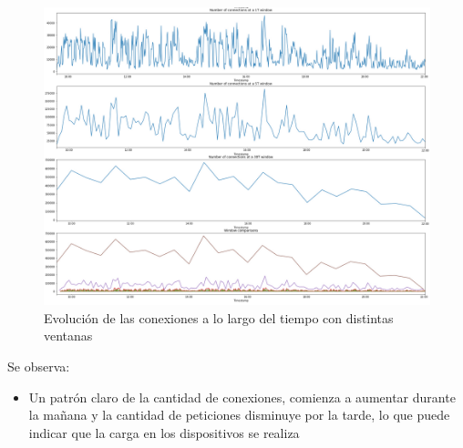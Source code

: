 \begin{figure}[H]
    \centering
    \includegraphics[width=17.5cm]{figs/daily_connections.PNG}
    \caption{Evolución de las conexiones a lo largo del tiempo con distintas ventanas}
    \label{fig:dailyconn}
\end{figure}

Se observa:

\begin{itemize}
    \item Un patrón claro de la cantidad de conexiones, comienza a aumentar durante la mañana y la cantidad de peticiones disminuye por la tarde, lo que puede indicar que la carga en los dispositivos se realiza
\end{itemize}